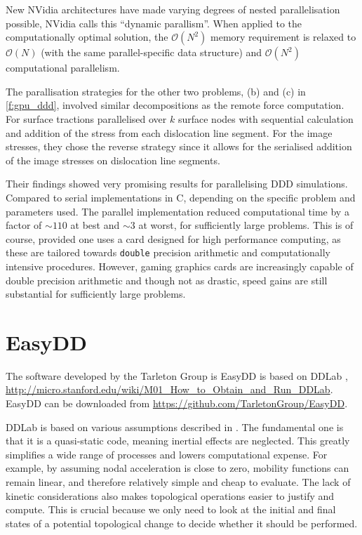 New NVidia architectures have made varying degrees of nested parallelisation possible, NVidia calls this ``dynamic parallism''. When applied to the computationally optimal solution, the $ \mathcal{O}(N^{2}) $ memory requirement is relaxed to $ \mathcal{O}(N) $ (with the same parallel-specific data structure) and $ \mathcal{O}(N^{2}) $ computational parallelism.

The parallisation strategies for the other two problems, (b) and (c) in \cref{f:gpu_ddd}, involved similar decompositions as the remote force computation. For surface tractions \citet{gpu_ddd} parallelised over $ k $ surface nodes with sequential calculation and addition of the stress from each dislocation line segment. For the image stresses, they chose the reverse strategy since it allows for the serialised addition of the image stresses on dislocation line segments.

Their findings showed very promising results for parallelising DDD simulations. Compared to serial implementations in C, depending on the specific problem and parameters used. The parallel implementation reduced computational time by a factor of $ \sim 110 $ at best and $ \sim 3 $ at worst, for sufficiently large problems. This is of course, provided one uses a card designed for high performance computing, as these are tailored towards \texttt{double} precision arithmetic and computationally intensive procedures. However, gaming graphics cards are increasingly capable of double precision arithmetic and though not as drastic, speed gains are still substantial for sufficiently large problems.

\section{EasyDD}
\label{s:EasyDDIntro}

The software developed by the Tarleton Group is EasyDD is based on DDLab \cite{ddlab}, \href{http://micro.stanford.edu/wiki/M01_How_to_Obtain_and_Run_DDLab}{http://micro.stanford.edu/wiki/M01\_How\_to\_Obtain\_and\_Run\_DDLab}. EasyDD can be downloaded from \href{https://github.com/TarletonGroup/EasyDD}{https://github.com/TarletonGroup/EasyDD}.

DDLab is based on various assumptions described in \cite{arsenlis2007enabling}. The fundamental one is that it is a quasi-static code, meaning inertial effects are neglected. This greatly simplifies a wide range of processes and lowers computational expense. For example, by assuming nodal acceleration is close to zero, mobility functions can remain linear, and therefore relatively simple and cheap to evaluate. The lack of kinetic considerations also makes topological operations easier to justify and compute. This is crucial because we only need to look at the initial and final states of a potential topological change to decide whether it should be performed.

